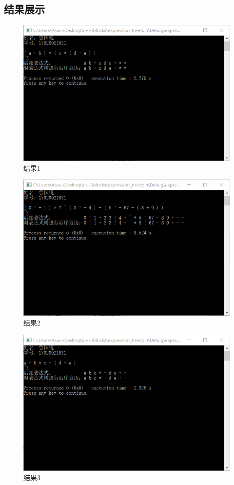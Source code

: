 \documentclass[UTF8]{ctexart}
\begin{document}
	\subsection{结果展示}
	\newpage
\begin{figure}[H]
	\centering 
	\includegraphics[scale=0.85]{res1.png} 
	\caption{结果1} 
	\label{res1}
\end{figure}

\begin{figure}[H]
	\centering 
	\includegraphics[scale=0.85]{res2.png} 
	\caption{结果2} 
	\label{res2}
\end{figure}

\begin{figure}[H]
	\centering 
	\includegraphics[scale=0.85]{res3.png} 
	\caption{结果3} 
	\label{res3}
\end{figure}
\end{document}
